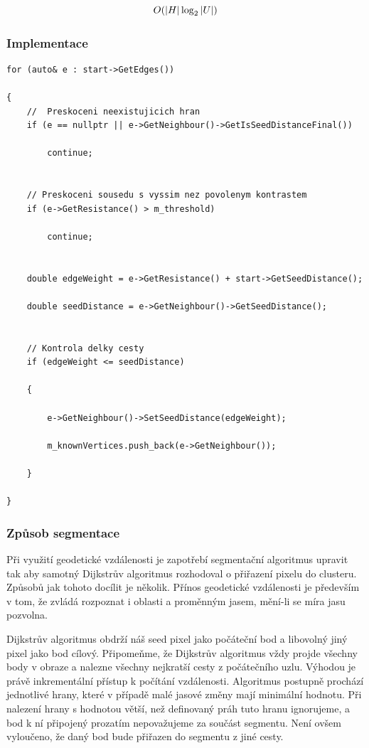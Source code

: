 \documentclass[czech, master, public, dept460, male, cpdeclaration, oneside]{diploma}
\begin{document}
\begin{equation}
\vspace*{+3.0mm}
O(|H|\log_2|U|)
\end{equation}

\newpage
\subsubsection{Implementace}
\begin{lstlisting}[label=src:Cpp,caption=Jádro dijskstrova algoritmu]
for (auto& e : start->GetEdges())

{
	// 	Preskoceni neexistujicich hran
	if (e == nullptr || e->GetNeighbour()->GetIsSeedDistanceFinal())

		continue;


	// Preskoceni sousedu s vyssim nez povolenym kontrastem
	if (e->GetResistance() > m_threshold)

		continue;


	double edgeWeight = e->GetResistance() + start->GetSeedDistance();

	double seedDistance = e->GetNeighbour()->GetSeedDistance();


	// Kontrola delky cesty
	if (edgeWeight <= seedDistance)

	{

		e->GetNeighbour()->SetSeedDistance(edgeWeight);

		m_knownVertices.push_back(e->GetNeighbour());

	}

}
\end{lstlisting}


\subsubsection{Způsob segmentace}
Při využití geodetické vzdálenosti je zapotřebí segmentační algoritmus upravit tak aby samotný Dijkstrův algoritmus rozhodoval o přiřazení pixelu do clusteru. Způsobů jak tohoto docílit je několik. Přínos geodetické vzdálenosti je především v tom, že zvládá rozpoznat i oblasti a proměnným jasem, mění-li se míra jasu pozvolna.\par
Dijkstrův algoritmus obdrží náš seed pixel jako počáteční bod a libovolný jiný pixel jako bod cílový. Připomeňme, že Dijkstrův algoritmus vždy projde všechny body v obraze a nalezne všechny nejkratší cesty z počátečního uzlu. Výhodou je právě inkrementální přístup k počítání vzdálenosti. Algoritmus postupně prochází jednotlivé hrany, které v případě malé jasové změny mají minimální hodnotu. Při nalezení hrany s hodnotou větší, než definovaný práh tuto hranu ignorujeme, a bod k ní připojený prozatím nepovažujeme za součást segmentu. Není ovšem vyloučeno, že daný bod bude přiřazen do segmentu z jiné cesty.\par
\end{document}

